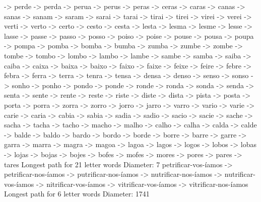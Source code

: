 \documentclass[a4paper,11pt]{article}
\begin{document}
-> perde -> perda -> perua -> perus -> peras -> ceras -> caras -> canas -> sanas -> sanam -> saram -> sarai -> tarai -> tirai -> tirei -> virei -> verei -> verti -> verto -> certo -> cesto -> cesta -> lesta -> lesma -> lesme -> lesse -> lasse -> passe -> passo -> posso -> poiso -> poise -> pouse -> pousa -> poupa -> pompa -> pomba -> bomba -> bumba -> zumba -> zumbe -> zombe -> tombe -> tombo -> lombo -> lambo -> lambe -> sambe -> samba -> saiba -> caiba -> caixa -> baixa -> baixo -> faixo -> faixe -> feixe -> feire -> febre -> febra -> ferra -> terra -> tenra -> tensa -> densa -> denso -> senso -> sonso -> sonho -> ponho -> pondo -> ponde -> ronde -> ronda -> sonda -> senda -> senta -> sente -> rente -> reste -> riste -> diste -> dista -> pista -> posta -> porta -> porra -> zorra -> zorro -> jorro -> jarro -> varro -> vario -> varie -> carie -> caria -> cabia -> sabia -> sadia -> sadio -> sacio -> sacie -> sache -> sacha -> tacha -> tacho -> macho -> malho -> calho -> calha -> calda -> calde -> balde -> baldo -> bardo -> bordo -> borde -> borre -> barre -> garre -> garra -> marra -> magra -> magoa -> lagoa -> lagos -> logos -> lobos -> lobas -> lojas -> bojas -> bojes -> bofes -> mofes -> mores -> pores -> pares -> tares
Longest path for 21 letter words
Diameter: 7
petrificar-vos-íamos -> petrificar-nos-íamos -> putrificar-nos-íamos -> nutrificar-nos-íamos -> nutrificar-vos-íamos -> nitrificar-vos-íamos -> vitrificar-vos-íamos -> vitrificar-nos-íamos
Longest path for 6 letter words
Diameter: 1741
\end{document}
